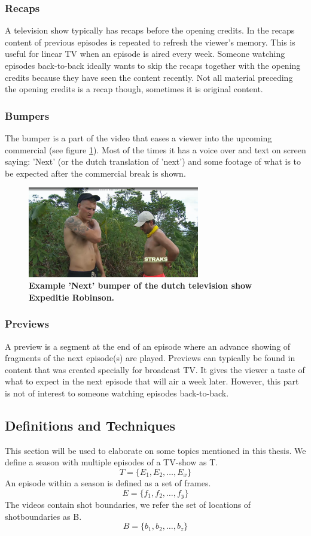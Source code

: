 \documentclass{article}
\begin{document}
\subsubsection{Recaps}
A television show typically has recaps before the opening credits. In the recaps content of previous episodes is repeated to refresh the viewer's memory. This is useful for linear TV when an episode is aired every week. Someone watching episodes back-to-back ideally wants to skip the recaps together with the opening credits because they have seen the content recently. Not all material preceding the opening credits is a recap though, sometimes it is original content.

\subsubsection{Bumpers}
The bumper is a part of the video that eases a viewer into the upcoming commercial (see figure \ref{examplebumper}). Most of the times it has a voice over and text on screen saying: 'Next' (or the dutch translation of 'next') and some footage of what is to be expected after the commercial break is shown.

\begin{figure}[H]
    \includegraphics[width=7.5cm]{images/straks.png}
    \centering
    \caption{\textbf{Example 'Next' bumper of the dutch television show Expeditie Robinson.}}
    \label{examplebumper}
\end{figure}

\subsubsection{Previews}
A preview is a segment at the end of an episode where an advance showing of fragments of the next episode(s) are played. Previews can typically be found in content that was created specially for broadcast TV. It gives the viewer a taste of what to expect in the next episode that will air a week later. However, this part is not of interest to someone watching episodes back-to-back.

\subsection{Definitions and Techniques}
This section will be used to elaborate on some topics mentioned in this thesis. We define a season with multiple episodes of a TV-show as T.
\[T = \{E_1, E_2, \dots, E_x\}\]
An episode within a season is defined as a set of frames.
\[E = \{f_1, f_2, \dots, f_y\}\]
The videos contain shot boundaries, we refer the set of locations of shotboundaries as B.
\[B = \{b_1, b_2, \dots, b_z\}\]
\end{document}
